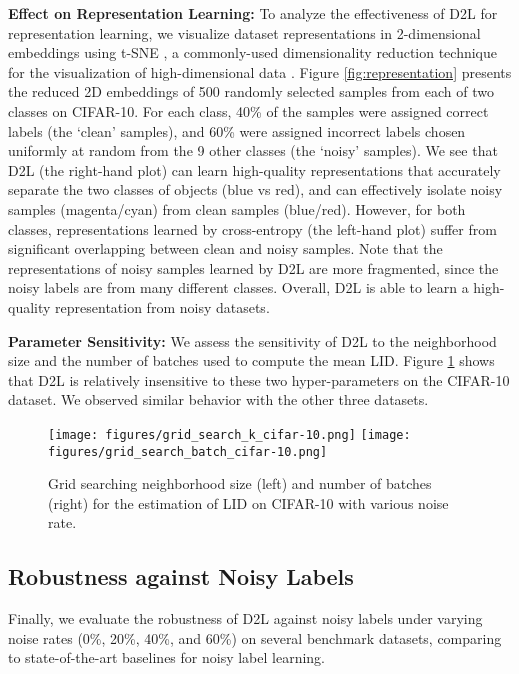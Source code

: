 \documentclass{article}
\begin{document}
\textbf{Effect on Representation Learning:}
\label{sec:regularization}
To analyze the effectiveness of D2L for representation learning, we visualize dataset representations in 2-dimensional embeddings using t-SNE \cite{maaten2008visualizing}, a commonly-used dimensionality reduction technique for the visualization of high-dimensional data \cite{lecun2015deep}. Figure \ref{fig:representation} presents the reduced 2D embeddings of 500 randomly selected samples from each of two classes on CIFAR-10. For each class, 40\% of the samples were assigned correct labels (the `clean' samples), and 60\% were assigned incorrect labels chosen uniformly at random from the 9 other classes (the `noisy' samples). We see that D2L (the right-hand plot) can learn high-quality representations that accurately separate the two classes of objects (blue vs red), and can effectively isolate noisy samples (magenta/cyan) from clean samples (blue/red). However, for both classes, representations learned by cross-entropy (the left-hand plot) suffer from significant overlapping between clean and noisy samples. Note that the representations of noisy samples learned by D2L are more fragmented, since the noisy labels are from many different classes. Overall, D2L is able to learn a high-quality representation from noisy datasets.











\textbf{Parameter Sensitivity:} We assess the sensitivity of D2L to the neighborhood size  and the number of batches  used to compute the mean LID. Figure \ref{fig:tuning_k} shows that D2L is relatively insensitive to these two hyper-parameters on the CIFAR-10 dataset. We observed similar behavior with the other three datasets.

\begin{figure}[!t]
\centering
\small
\texttt{[image: figures/grid\_search\_k\_cifar-10.png]}
\texttt{[image: figures/grid\_search\_batch\_cifar-10.png]}
\caption{Grid searching neighborhood size  (left) and number of batches  (right) for the estimation of LID on CIFAR-10 with various noise rate.}
\label{fig:tuning_k}
\vspace{-0.2in}
\end{figure}

\subsection{Robustness against Noisy Labels}\label{sec:robustness_test}
Finally, we evaluate the robustness of D2L against noisy labels under varying noise rates (0\%, 20\%, 40\%, and 60\%) on several benchmark datasets, comparing to state-of-the-art baselines for noisy label learning.
\end{document}
